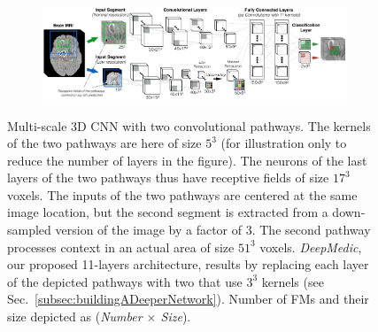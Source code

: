 
\begin{figure}[!h]
\centering
\begin{subfigure}[b]{1.0\textwidth}
\centering
	\includegraphics[clip=true, trim=0pt 0pt 0pt 0pt, width=1.0\textwidth]{figures/methodSection/multiscale/cnnSystemMultiscale.png}
\end{subfigure}
\caption{Multi-scale 3D CNN with two convolutional pathways. The kernels of the two pathways are here of size $5^3$ (for illustration only to reduce the number of layers in the figure). The neurons of the last layers of the two pathways thus have receptive fields of size $17^3$ voxels. The inputs of the two pathways are centered at the same image location, but the second segment is extracted from a down-sampled version of the image by a factor of 3. The second pathway processes context in an actual area of size $51^3$ voxels. \textit{DeepMedic}, our proposed 11-layers architecture, results by replacing each layer of the depicted pathways with two that use $3^3$ kernels (see Sec.~\ref{subsec:buildingADeeperNetwork}). Number of FMs and their size depicted as (\textit{Number $\times$ Size}).}
\label{fig:cnnMultiscale}
\end{figure}
